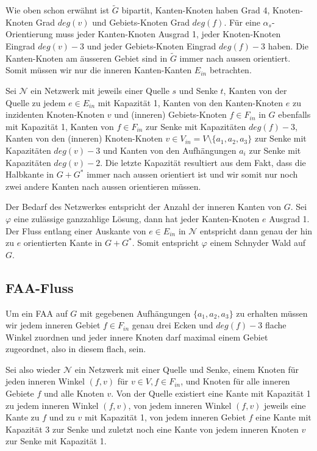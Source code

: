 Wie oben schon erwähnt ist $\tilde{G}$ bipartit, Kanten-Knoten haben Grad 4, Knoten-Knoten Grad $deg(v)$ und Gebiets-Knoten Grad $deg(f)$. Für eine $\alpha_s$-Orientierung muss jeder Kanten-Knoten Ausgrad 1, jeder Knoten-Knoten Eingrad $deg(v)-3$ und jeder Gebiets-Knoten Eingrad $deg(f)-3$ haben. Die Kanten-Knoten am äusseren Gebiet sind in $\tilde{G}$ immer nach aussen orientiert. Somit müssen wir nur die inneren Kanten-Kanten $E_{in}$ betrachten. \

Sei $\mathcal{N}$ ein Netzwerk mit jeweils einer Quelle $s$ und Senke $t$, Kanten von der Quelle zu jedem $e \in E_{in}$ mit Kapazität 1, Kanten von den Kanten-Knoten $e$ zu inzidenten Knoten-Knoten $v$ und (inneren) Gebiets-Knoten $f \in F_{in}$ in $G$ ebenfalls mit Kapazität 1, Kanten von $f \in F_{in}$ zur Senke mit Kapazitäten $deg(f)-3$, Kanten von den (inneren) Knoten-Knoten $v \in V_{in} = V \setminus \{a_1,a_2,a_3\}$ zur Senke mit Kapazitäten $deg(v)-3$ und Kanten von den Aufhängungen $a_i$ zur Senke mit Kapazitäten $deg(v)-2$. Die letzte Kapazität resultiert aus dem Fakt, dass die Halbkante in $G+G^*$ immer nach aussen orientiert ist und wir somit nur noch zwei andere Kanten nach aussen orientieren müssen.


Der Bedarf des Netzwerkes entspricht der Anzahl der inneren Kanten von $G$. Sei $\varphi$ eine zulässige ganzzahlige Lösung, dann hat jeder Kanten-Knoten $e$ Ausgrad 1. Der Fluss entlang einer Auskante von $e \in E_{in}$ in $\mathcal{N}$ entspricht dann genau der hin zu $e$ orientierten Kante in $G+G^*$. Somit entspricht $\varphi$ einem Schnyder Wald auf $G$.

\subsection{FAA-Fluss}

Um ein FAA auf $G$ mit gegebenen Aufhängungen $\{a_1,a_2,a_3\}$ zu erhalten müssen wir jedem inneren Gebiet $f \in F_{in}$ genau drei Ecken und $deg(f)-3$ flache Winkel zuordnen und jeder innere Knoten darf maximal einem Gebiet zugeordnet, also in diesem flach, sein.\

Sei also wieder $\mathcal{N}$ ein Netzwerk mit einer Quelle und Senke, einem Knoten für jeden inneren Winkel $(f,v)$ für $v\in V, f \in F_{in}$, und Knoten für alle inneren Gebiete $f$ und alle Knoten $v$. Von der Quelle existiert eine Kante mit Kapazität 1 zu jedem inneren Winkel $(f,v)$, von jedem inneren Winkel $(f,v)$ jeweils eine Kante zu $f$ und zu $v$ mit Kapazität 1, von jedem inneren Gebiet $f$ eine Kante mit Kapazität 3 zur Senke und zuletzt noch eine Kante von jedem inneren Knoten $v$ zur Senke mit Kapazität 1.

